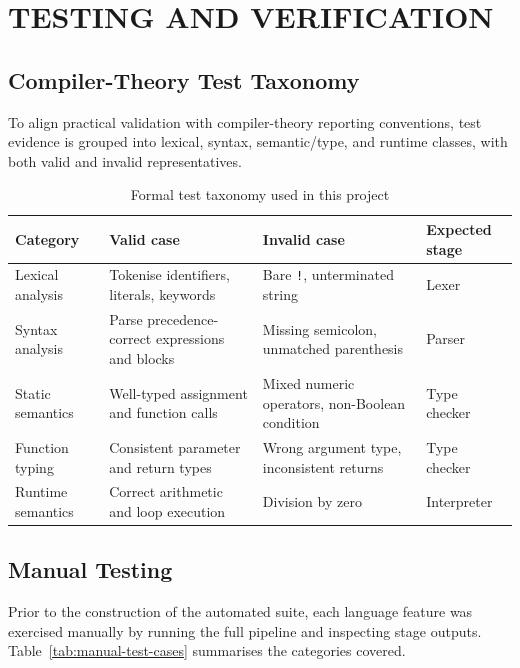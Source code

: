 \chapter{TESTING AND VERIFICATION}

\section{Compiler-Theory Test Taxonomy}
To align practical validation with compiler-theory reporting conventions, test
evidence is grouped into lexical, syntax, semantic/type, and runtime classes,
with both valid and invalid representatives.

\begin{table}[H]
\centering
\caption{Formal test taxonomy used in this project}
\label{tab:formal-test-taxonomy}
\small
\begin{tabular}{p{3.2cm}p{3.7cm}p{4.8cm}p{2.3cm}}
\toprule
Category & Valid case & Invalid case & Expected stage \\
\midrule
Lexical analysis & Tokenise identifiers, literals, keywords & Bare \texttt{!}, unterminated string & Lexer \\
Syntax analysis & Parse precedence-correct expressions and blocks & Missing semicolon, unmatched parenthesis & Parser \\
Static semantics & Well-typed assignment and function calls & Mixed numeric operators, non-Boolean condition & Type checker \\
Function typing & Consistent parameter and return types & Wrong argument type, inconsistent returns & Type checker \\
Runtime semantics & Correct arithmetic and loop execution & Division by zero & Interpreter \\
\bottomrule
\end{tabular}
\end{table}

\section{Manual Testing}
Prior to the construction of the automated suite, each language feature was
exercised manually by running the full pipeline and inspecting stage outputs.
Table~\ref{tab:manual-test-cases} summarises the categories covered.

